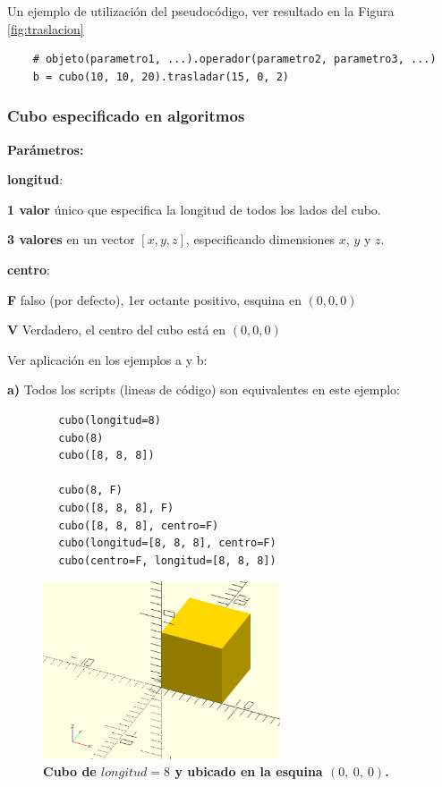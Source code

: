 \vspace{5mm}
Un ejemplo de utilización del pseudocódigo, ver resultado en la Figura \ref{fig:traslacion}

\begin{verbatim}
    # objeto(parametro1, ...).operador(parametro2, parametro3, ...)
    b = cubo(10, 10, 20).trasladar(15, 0, 2) 
\end{verbatim}


\clearpage
\subsubsection{Cubo especificado en algoritmos}
\begin{description}
\item  \textbf{Parámetros:}
\item   \textbf{longitud}:
\begin{description}
\item \textbf{1 valor} único que especifica la longitud de todos los lados del cubo.
\item \textbf{3 valores} en un vector $[x,y,z]$, especificando dimensiones $x$, $y$ y $z$.
\end{description}
\item   \textbf{centro}:
\begin{description}
\item \textbf{F} falso (por defecto), 1er octante positivo, esquina en $(0, 0, 0)$
\item \textbf{V} Verdadero, el centro del cubo está en $(0, 0, 0)$
\end{description}
\end{description}

Ver aplicación en los ejemplos a y b:

\textbf{a)} Todos los scripts (lineas de código) son equivalentes en este ejemplo: \begin{listing}[ht]
\begin{verbatim}
        cubo(longitud=8)
        cubo(8)
        cubo([8, 8, 8])
         
        cubo(8, F)
        cubo([8, 8, 8], F)
        cubo([8, 8, 8], centro=F)
        cubo(longitud=[8, 8, 8], centro=F)
        cubo(centro=F, longitud=[8, 8, 8])
\end{verbatim}
\end{listing}

\begin{figure}[h]
\includegraphics[width=7cm]{Img/Modelos/modelado1.jpg}
\centering
\caption{\textbf{\footnotesize{Cubo de $longitud = 8$ y ubicado en la esquina $(0,\ 0, \ 0)$. }}}
\end{figure}


